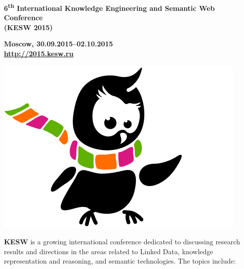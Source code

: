 \documentclass[a4paper, 10pt]{article}
\renewcommand{\skip}{\vspace{1ex}}
\begin{document}
\begin{minipage}{.80\textwidth}
\begin{center}

\Large{\bf 6\textsuperscript{th} International Knowledge Engineering and Semantic Web Conference 
\\ (KESW 2015)}

\skip\skip

\large{\bf Moscow, 30.09.2015--02.10.2015 
\\
\url{http://2015.kesw.ru}}
\end{center}

\end{minipage}
\hfill
\begin{minipage}{.21\textwidth}

\includegraphics[width=\textwidth]{kesw}

\end{minipage}

\skip\skip

\noindent
\textbf{KESW} is a growing international conference dedicated to discussing
research results and directions in the areas related to Linked Data, knowledge representation and
reasoning, and semantic technologies. The topics include:

\skip
\skip
\end{document}
